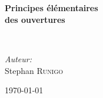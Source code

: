 \begin{titlepage}
%
~\\[1cm]

\begin{center}
\end{center}

\textsc{\Large }\\[0.5cm]

\HRule

\begin{center}
{\huge \bfseries  Principes élémentaires\\
des ouvertures\\[0.4cm] }
\end{center}

\HRule \\[1.5cm]

\begin{center}
\end{center}

\begin{center}
\end{center}


\begin{minipage}{0.4\textwidth}
\begin{flushleft} \large
\end{flushleft}
\end{minipage}
\begin{minipage}{0.4\textwidth}
\begin{flushright} \large
\emph{Auteur:}\\
Stephan \textsc{Runigo}
\end{flushright}
\end{minipage}

\vfill

{\large \today}

\end{titlepage}
